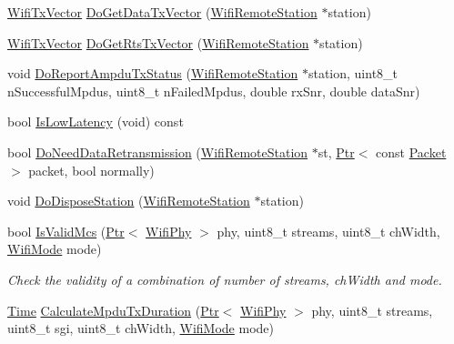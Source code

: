 \begin{DoxyCompactItemize}
\hyperlink{classns3_1_1WifiTxVector}{Wifi\+Tx\+Vector} \hyperlink{classns3_1_1MinstrelHtWifiManager_abc2436c9c8dabb7c78907f478e1bb8c7}{Do\+Get\+Data\+Tx\+Vector} (\hyperlink{structns3_1_1WifiRemoteStation}{Wifi\+Remote\+Station} $\ast$station)
\item 
\hyperlink{classns3_1_1WifiTxVector}{Wifi\+Tx\+Vector} \hyperlink{classns3_1_1MinstrelHtWifiManager_a8628d42b27a3bf5cbbd4ea0ec2a79307}{Do\+Get\+Rts\+Tx\+Vector} (\hyperlink{structns3_1_1WifiRemoteStation}{Wifi\+Remote\+Station} $\ast$station)
\item 
void \hyperlink{classns3_1_1MinstrelHtWifiManager_a2a1c915cc3def7e9bff5da0123a16040}{Do\+Report\+Ampdu\+Tx\+Status} (\hyperlink{structns3_1_1WifiRemoteStation}{Wifi\+Remote\+Station} $\ast$station, uint8\+\_\+t n\+Successful\+Mpdus, uint8\+\_\+t n\+Failed\+Mpdus, double rx\+Snr, double data\+Snr)
\item 
bool \hyperlink{classns3_1_1MinstrelHtWifiManager_a9dfa8dd0c37f8707df39e1bbc2df013b}{Is\+Low\+Latency} (void) const 
\item 
bool \hyperlink{classns3_1_1MinstrelHtWifiManager_adb495f5af6c0f3d22396a0c05869d33f}{Do\+Need\+Data\+Retransmission} (\hyperlink{structns3_1_1WifiRemoteStation}{Wifi\+Remote\+Station} $\ast$st, \hyperlink{classns3_1_1Ptr}{Ptr}$<$ const \hyperlink{classns3_1_1Packet}{Packet} $>$ packet, bool normally)
\item 
void \hyperlink{classns3_1_1MinstrelHtWifiManager_a7cdd11ae7e8f95adeb2dcd03a9697bba}{Do\+Dispose\+Station} (\hyperlink{structns3_1_1WifiRemoteStation}{Wifi\+Remote\+Station} $\ast$station)
\item 
bool \hyperlink{classns3_1_1MinstrelHtWifiManager_a6e96fca0f8a7295e41cdbeea9d7dae32}{Is\+Valid\+Mcs} (\hyperlink{classns3_1_1Ptr}{Ptr}$<$ \hyperlink{classns3_1_1WifiPhy}{Wifi\+Phy} $>$ phy, uint8\+\_\+t streams, uint8\+\_\+t ch\+Width, \hyperlink{classns3_1_1WifiMode}{Wifi\+Mode} mode)
\begin{DoxyCompactList}\small\item\em Check the validity of a combination of number of streams, ch\+Width and mode. \end{DoxyCompactList}\item 
\hyperlink{classns3_1_1Time}{Time} \hyperlink{classns3_1_1MinstrelHtWifiManager_a0e356a05e616986cb292a72901984d4f}{Calculate\+Mpdu\+Tx\+Duration} (\hyperlink{classns3_1_1Ptr}{Ptr}$<$ \hyperlink{classns3_1_1WifiPhy}{Wifi\+Phy} $>$ phy, uint8\+\_\+t streams, uint8\+\_\+t sgi, uint8\+\_\+t ch\+Width, \hyperlink{classns3_1_1WifiMode}{Wifi\+Mode} mode)

\end{DoxyCompactItemize}
